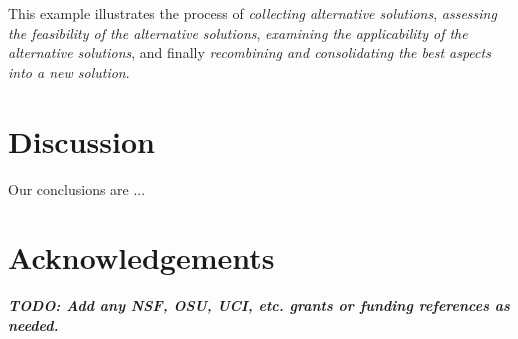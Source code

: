 \documentclass{ppig}
\newcommand{\todo}[1]{\textit{\textbf{\color{red}TODO: #1}}} %
\begin{document}
This example illustrates the process of \textit{collecting alternative solutions}, 
\textit{assessing the feasibility of the alternative solutions}, \textit{examining the applicability of the alternative solutions}, and finally \textit{recombining and consolidating the best aspects into a new solution}.

\section{Discussion}
Our conclusions are ...


\section{Acknowledgements}
\todo{Add any NSF, OSU, UCI, etc. grants or funding references as needed.}


 
\end{document}
